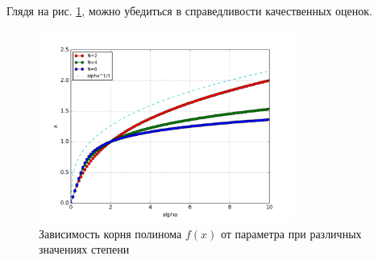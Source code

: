 \documentclass[a4paper]{article}
\begin{document}
Глядя на рис. \ref{fig:roots}, можно убедиться в справедливости качественных оценок.

\begin{figure}[ht]
	\center
  \includegraphics[width=0.75\textwidth]{../pictures/lab1_roots.png}
  \caption{Зависимость корня полинома \(f(x)\) от параметра при различных значениях степени}
  \label{fig:roots}
\end{figure}

\section{}


\end{document}

